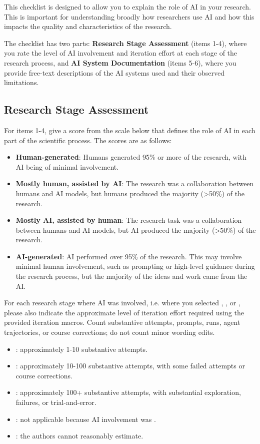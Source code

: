 \documentclass{article}
\begin{document}
This checklist is designed to allow you to explain the role of AI in your research. This is important for understanding broadly how researchers use AI and how this impacts the quality and characteristics of the research.

The checklist has two parts: \textbf{Research Stage Assessment} (items 1-4), where you rate the level of AI involvement and iteration effort at each stage of the research process, and \textbf{AI System Documentation} (items 5-6), where you provide free-text descriptions of the AI systems used and their observed limitations.

\subsection*{Research Stage Assessment}

For items 1-4, give a score from the scale below that defines the role of AI in each part of the scientific process. The scores are as follows:

\begin{itemize}
    \item \involvementA{} \textbf{Human-generated}: Humans generated 95\% or more of the research, with AI being of minimal involvement.
    \item \involvementB{} \textbf{Mostly human, assisted by AI}: The research was a collaboration between humans and AI models, but humans produced the majority (>50\%) of the research.
    \item \involvementC{} \textbf{Mostly AI, assisted by human}: The research task was a collaboration between humans and AI models, but AI produced the majority (>50\%) of the research.
    \item \involvementD{} \textbf{AI-generated}: AI performed over 95\% of the research. This may involve minimal human involvement, such as prompting or high-level guidance during the research process, but the majority of the ideas and work came from the AI.
\end{itemize}

For each research stage where AI was involved, i.e. where you selected \involvementB{}, \involvementC{}, or \involvementD{}, please also indicate the approximate level of iteration effort required using the provided iteration macros. Count substantive attempts, prompts, runs, agent trajectories, or course corrections; do not count minor wording edits.

\begin{itemize}
    \item \iterationLow{}: approximately 1-10 substantive attempts.
    \item \iterationMedium{}: approximately 10-100 substantive attempts, with some failed attempts or course corrections.
    \item \iterationHigh{}: approximately 100+ substantive attempts, with substantial exploration, failures, or trial-and-error.
    \item \iterationNA{}: not applicable because AI involvement was \involvementA{}.
    \item \iterationUnclear{}: the authors cannot reasonably estimate.
\end{itemize}
\end{document}
